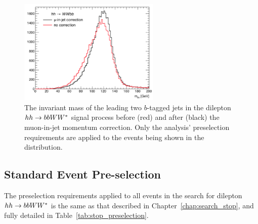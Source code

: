 \begin{figure}[!htb]
    \begin{center}
        \includegraphics[width=0.6\textwidth]{figures/search_hh/bjet_correction_wwbb}
        \caption{
            The invariant mass of the leading two $b$-tagged jets in the dilepton $hh \rightarrow bbWW^*$ signal
            process before (red) and after (black) the muon-in-jet momentum correction.
            Only the analysis' preselection requirements are applied to the events being shown in the distribution.
        }
        \label{fig:bjet_correction}
    \end{center}
\end{figure}

%
%
\subsection{Standard Event Pre-selection}
\label{sec:hh_preselection}

The preselection requirements applied to all events in the search for dilepton $hh \rightarrow bbWW^*$
is the same as that described in Chapter~\ref{chap:search_stop}, and fully detailed in
Table~\ref{tab:stop_preselection}.
